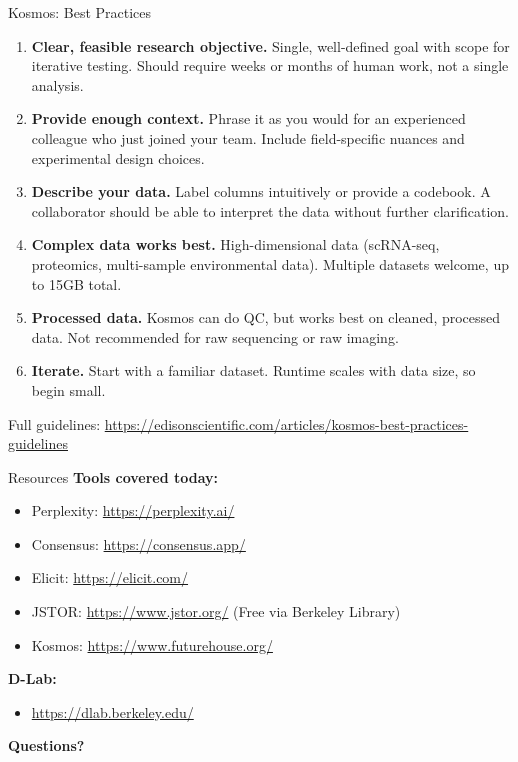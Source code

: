 \documentclass[aspectratio=169]{beamer}
\begin{document}
\begin{frame}{Kosmos: Best Practices}
    \begin{enumerate}
        \item \textbf{Clear, feasible research objective.} Single, well-defined goal with scope for iterative testing. Should require weeks or months of human work, not a single analysis.
        \item \textbf{Provide enough context.} Phrase it as you would for an experienced colleague who just joined your team. Include field-specific nuances and experimental design choices.
        \item \textbf{Describe your data.} Label columns intuitively or provide a codebook. A collaborator should be able to interpret the data without further clarification.
        \item \textbf{Complex data works best.} High-dimensional data (scRNA-seq, proteomics, multi-sample environmental data). Multiple datasets welcome, up to 15GB total.
        \item \textbf{Processed data.} Kosmos can do QC, but works best on cleaned, processed data. Not recommended for raw sequencing or raw imaging.
        \item \textbf{Iterate.} Start with a familiar dataset. Runtime scales with data size, so begin small.
    \end{enumerate}

    \vspace{0.3em}
    {\footnotesize Full guidelines: \url{https://edisonscientific.com/articles/kosmos-best-practices-guidelines}}
\end{frame}


\begin{frame}{Resources}
    \textbf{Tools covered today:}
    \begin{itemize}
        \item Perplexity: \url{https://perplexity.ai/}
        \item Consensus: \url{https://consensus.app/}
        \item Elicit: \url{https://elicit.com/}
        \item JSTOR: \url{https://www.jstor.org/} (Free via Berkeley Library)
        \item Kosmos: \url{https://www.futurehouse.org/}
    \end{itemize}

    \vspace{1em}
    \textbf{D-Lab:}
    \begin{itemize}
        \item \url{https://dlab.berkeley.edu/}
    \end{itemize}

    \vspace{1em}
    \textbf{Questions?}
\end{frame}
\end{document}
